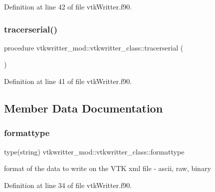 Definition at line 42 of file vtk\+Writter.\+f90.

\mbox{\label{structvtkwritter__mod_1_1vtkwritter__class_ad87da7194456a9b70f60f53f19a5c47b}} 
\subsubsection{\texorpdfstring{tracerserial()}{tracerserial()}}
{\footnotesize\ttfamily procedure vtkwritter\+\_\+mod\+::vtkwritter\+\_\+class\+::tracerserial (\begin{DoxyParamCaption}{ }\end{DoxyParamCaption})\hspace{0.3cm}{\ttfamily [private]}}



Definition at line 41 of file vtk\+Writter.\+f90.



\subsection{Member Data Documentation}
\mbox{\label{structvtkwritter__mod_1_1vtkwritter__class_a1488d11c6ab4adaf97a2eac301bab694}} 
\subsubsection{\texorpdfstring{formattype}{formattype}}
{\footnotesize\ttfamily type(string) vtkwritter\+\_\+mod\+::vtkwritter\+\_\+class\+::formattype\hspace{0.3cm}{\ttfamily [private]}}



format of the data to write on the V\+TK xml file -\/ ascii, raw, binary 



Definition at line 34 of file vtk\+Writter.\+f90.


